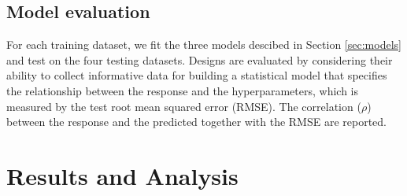 \documentclass [PhD] {package/uclathes}
\begin{document}
\subsection*{{Model evaluation}}
For each training dataset, we fit the three models descibed in Section \ref{sec:models} and test on the four testing datasets. Designs are evaluated by considering their ability to collect informative data for building a statistical model that specifies the relationship between the response and the hyperparameters, which is measured by the test root mean squared error (RMSE). The correlation ($\rho$) between the response and the predicted together with the RMSE are reported.

\section{Results and Analysis}

\end{document}
